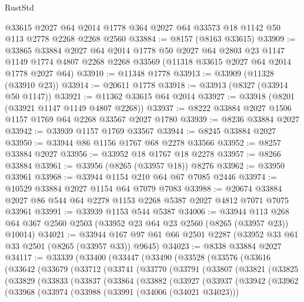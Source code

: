 \begin{lexlean}{RustStd}
\begin{coremodule}
    @33615
    @2027
    @64
    @2014
    @1778
    @364
    @2027
    @64
    @33573
    @18
    @1142
    @50
    @113
    @2778
    @2268
    @2268
    @2560
@33884 := @8157 (@8163 @33615)
@33909 := @33865
    @33884
    @2027
    @64
    @2014
    @1778
    @50
    @2027
    @64
    @2803
    @23
    @1147
    @1149
    @1774
    @4807
    @2268
    @2268
    @33569
    (@11318 @33615 @2027 @64 @2014 @1778 @2027 @64)
@33910 := @11348 @1778
@33913 := @33909 (@11328 (@33910 @23))
@33914 := @20611 @1778
@33918 := @33913 (@8327 (@33914 @50 @1147))
@33921 := @11362 @33615 @64 @2014
@33927 := @33918 (@8201 (@33921 @1147 @1149 @4807 @2268))
@33937 := @8222 @33884 @2027 @1506 @1157 @1769 @64 @2268 @33567 @2027 @1780
@33939 := @8236 @33884 @2027
@33942 := @33939 @1157 @1769 @33567
@33944 := @8245 @33884 @2027
@33950 := @33944 @86 @1156 @1767 @68 @2278 @33566
@33952 := @8257 @33884 @2027
@33956 := @33952 @18 @1767 @18 @2278
@33957 := @8266 @33884
@33961 := @33956 (@8265 (@33957 @18)) @8276
@33962 := @33950 @33961
@33968 := @33944 @1154 @210 @64 @67 @7085 @2446
@33974 := @10529 @33884 @2027 @1154 @64 @7079 @7083
@33988 := @20674 @33884 @2027 @86 @544 @64 @2278 @1153 @2268 @5387 @2027 @4812 @7071 @7075 @33961
@33991 := @33939 @1153 @544 @5387
@34006 := @33944
    @113
    @268
    @64
    @367
    @2560
    @2503
    (@33952 @23 @64 @23 @2560 (@8265 (@33957 @23)) @10014)
@34021 := @33944 @167 @97 @61 @66 @2501 @2287 (@33952 @33 @61 @33 @2501 (@8265 (@33957 @33)) @9645)
@34023 := @8338 @33884 @2027
@34117 := @33339
    (@33400
      (@33447
        (@33490
          (@33528
            (@33576
              (@33616
                (@33642
                  (@33679
                    (@33712
                      (@33741
                        (@33770
                          (@33791
                            (@33807
                              (@33821
                                (@33825
                                  (@33829
                                    (@33833
                                      (@33837
                                        (@33864
                                          (@33882
                                            (@33927
                                              (@33937
                                                (@33942
                                                  (@33962
                                                    (@33968
                                                      (@33974
                                                        (@33988
                                                          (@33991 (@34006 (@34021 @34023)))

\end{coremodule}
\end{lexlean}
